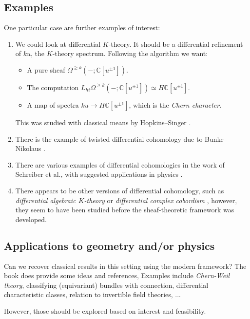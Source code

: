 \documentclass[10pt]{amsart}
\newcommand{\bC}{\mathbb{C}}
\theoremstyle{definition}
\theoremstyle{remark}
\numberwithin{equation}{section}
\begin{document}
\subsection{Examples}
One particular case are further examples of interest:
\begin{enumerate}
  \item We could look at differential $K$-theory. It should be a differential refinement of $ku$, the $K$-theory spectrum. Following the algorithm we want:
  \begin{itemize}
   \item A pure sheaf $\Omega^{\geq k}(- ;\mathbb{C}[u^{\pm 1}])$.
   \item The computation $L_{hi}\Omega^{\geq k}(- ;\mathbb{C}[u^{\pm 1}]) \simeq H\bC[u^{\pm 1}]$.
   \item A map of spectra $ku \to H\bC[u^{\pm 1}]$, which is the \emph{Chern character}.
  \end{itemize}
  This was studied with classical means by Hopkins--Singer \cite{hopkinssinger2005diffcoh}.
  \item There is the example of twisted differential cohomology due to Bunke--Nikolaus \cite{bunkenikolaus2019twisted}.
  \item There are various examples of differential cohomologies in the work of Schreiber et al., with suggested applications in physics \cite{fiorenzasatischreiber2024charactermap}. 
  \item There appears to be other versions of differential cohomology, such as \emph{differential algebraic $K$-theory} \cite{bunkegepner2021diffktheory} or \emph{differential complex cobordism} \cite{bunkeschickschroederwiethaup2009landweber}, however, they seem to have been studied before the sheaf-theoretic framework was developed.
\end{enumerate}

\subsection{Applications to geometry and/or physics}
Can we recover classical results in this setting using the modern framework? The book \cite{amabeldebrayhaine2021diffcoh} does provide some ideas and references, Examples include \emph{Chern-Weil theory}, classifying (equivariant) bundles with connection, differential characteristic classes, relation to invertible field theories, ... 

However, those should be explored based on interest and feasibility.

{\footnotesize


}
\end{document}
